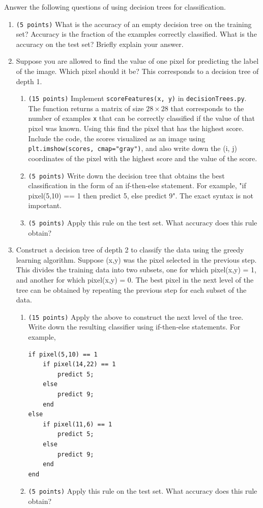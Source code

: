 \documentclass[10pt,letterpaper]{article}
\newcommand{\cmd}[1] {{\color{blue}\texttt{#1}}}
\begin{document}
Answer the following questions of using decision trees for classification.
\begin{enumerate}
\item \cmd{(5 points)} What is the accuracy of an empty decision tree
  on the training set? Accuracy is the fraction of the examples
  correctly classified. What is the accuracy on the test set? Briefly explain your answer.

\item Suppose you are allowed to find the value of one pixel for
  predicting the label of the image. Which pixel should it be? This
  corresponds to a decision tree of depth 1.
  

\begin{enumerate}
\item \cmd{(15 points)} Implement \cmd{scoreFeatures(x, y)} in
  \cmd{decisionTrees.py}. The function returns a matrix of size
  $28\times 28$ that corresponds to the number of examples \cmd{x}
  that can be correctly classified if the value of that pixel was
  known.
Using this find the pixel that has the highest score. 
Include the code, the scores visualized as an image using \cmd{plt.imshow(scores, cmap="gray")}, 
and also write down the (i, j) coordinates of the pixel with the
highest score and the value of the score.

\item \cmd{(5 points)} Write down the decision tree that obtains the
  best classification in the form of an if-then-else statement. For
  example, "if pixel(5,10) == 1 then predict 5, else predict 9". The
  exact syntax is not important.
 
\item \cmd{(5 points)} Apply this rule on the test set. What accuracy does this rule obtain?
\end{enumerate}

\item Construct a decision tree of depth 2 to classify the data using
  the greedy learning algorithm.
Suppose (x,y) was the pixel selected in the previous step.
This divides the training data into two subsets, one for which
pixel(x,y) = 1, and another for which pixel(x,y) = 0.
The best pixel in the next level of the tree can be obtained by
repeating the previous step for each subset of the data.
\begin{enumerate}
\item \cmd{(15 points)} Apply the above to construct the next level of
  the tree. Write down the resulting classifier using if-then-else
  statements. For example,
\begin{verbatim}
if pixel(5,10) == 1
    if pixel(14,22) == 1
        predict 5;
    else
        predict 9;
    end
else 
    if pixel(11,6) == 1
        predict 5;
    else
        predict 9;
    end
end
\end{verbatim}
\item \cmd{(5 points)} Apply this rule on the test set. What accuracy does this rule obtain?
\end{enumerate}
\end{enumerate}
\end{document}
